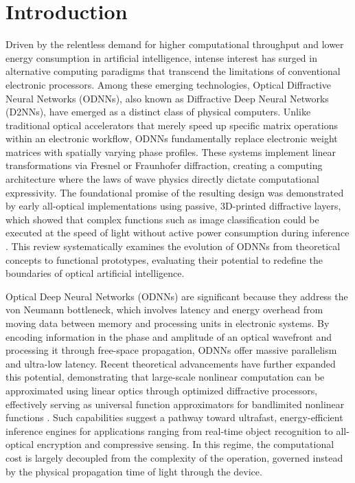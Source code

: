 \section{Introduction}\label{introduction}

Driven by the relentless demand for higher computational throughput and lower energy consumption in artificial intelligence, intense interest has surged in alternative computing paradigms that transcend the limitations of conventional electronic processors. Among these emerging technologies, Optical Diffractive Neural Networks (ODNNs), also known as Diffractive Deep Neural Networks (D2NNs), have emerged as a distinct class of physical computers. Unlike traditional optical accelerators that merely speed up specific matrix operations within an electronic workflow, ODNNs fundamentally replace electronic weight matrices with spatially varying phase profiles. These systems implement linear transformations via Fresnel or Fraunhofer diffraction, creating a computing architecture where the laws of wave physics directly dictate computational expressivity. The foundational promise of the resulting design was demonstrated by early all-optical implementations using passive, 3D-printed diffractive layers, which showed that complex functions such as image classification could be executed at the speed of light without active power consumption during inference \citep{doi_10_1126_science_aat8084_e055772d}. This review systematically examines the evolution of ODNNs from theoretical concepts to functional prototypes, evaluating their potential to redefine the boundaries of optical artificial intelligence.

Optical Deep Neural Networks (ODNNs) are significant because they address the von Neumann bottleneck, which involves latency and energy overhead from moving data between memory and processing units in electronic systems. By encoding information in the phase and amplitude of an optical wavefront and processing it through free-space propagation, ODNNs offer massive parallelism and ultra-low latency. Recent theoretical advancements have further expanded this potential, demonstrating that large-scale nonlinear computation can be approximated using linear optics through optimized diffractive processors, effectively serving as universal function approximators for bandlimited nonlinear functions \citep{doi_10_1186_s43593_025_00113_w_ca9e8e1e}. Such capabilities suggest a pathway toward ultrafast, energy-efficient inference engines for applications ranging from real-time object recognition to all-optical encryption and compressive sensing. In this regime, the computational cost is largely decoupled from the complexity of the operation, governed instead by the physical propagation time of light through the device.

